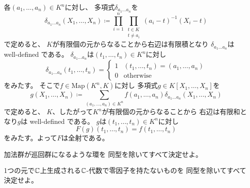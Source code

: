 \documentclass[report]{jlreq}
\begin{document}
\begin{answer}
    各$(a_1, \dots, a_n) \in K^n$に対し、
    多項式$\delta_{a_1 \dots a_n}$を
    \begin{equation}
        \delta_{a_1 \dots a_n}(X_1, \dots, X_n)
            \coloneqq \prod_{i = 1}^n \prod_{\substack{t \in K \\ t \neq a_i}}
            (a_i - t)^{-1} (X_i - t)
    \end{equation}
    で定めると、
    $K$が有限個の元からなることから右辺は有限積となり
    $\delta_{a_1 \dots a_n}$は well-defined である。
    $\delta_{a_1 \dots a_n}$は$(t_1, \dots, t_n) \in K^n$に対し
    \begin{equation}
        \delta_{a_1 \dots a_n}(t_1, \dots, t_n)
            = \begin{cases}
                1 & (t_1, \dots, t_n) = (a_1, \dots, a_n) \\
                0 & \text{otherwise}
            \end{cases}
    \end{equation}
    をみたす。
    そこで$f \in \mathrm{Map}(K^n, K)$に対し
    多項式$g \in K[X_1, \dots, X_n]$を
    \begin{equation}
        g(X_1, \dots, X_n) \coloneqq \sum_{(a_1, \dots, a_n) \in K^n}
            f(a_1, \dots, a_n) \delta_{a_1 \dots a_n}(X_1, \dots, X_n)
    \end{equation}
    で定めると、
    $K$、したがって$K^n$が有限個の元からなることから
    右辺は有限和となり$g$は well-defined である。
    $g$は$(t_1, \dots, t_n) \in K^n$に対し
    \begin{equation}
        F(g)(t_1, \dots, t_n) = f(t_1, \dots, t_n)
    \end{equation}
    をみたす。よって$F$は全射である。
\end{answer}


\begin{problem}[代数学II 2.26]
    加法群が巡回群になるような環を
    同型を除いてすべて決定せよ。
\end{problem}

\begin{answer}
    \TODO{}
\end{answer}


\begin{problem}[代数学II 2.27]
    1つの元で$\mathbb{C}$上生成される$\mathbb{C}$-代数で零因子を持たないものを
    同型を除いてすべて決定せよ。
\end{problem}
\end{document}
